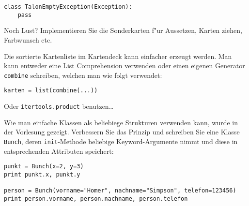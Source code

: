 \begin{aufgabe}
\begin{teilaufgabe}[Grundlagen]
\begin{lstlisting}
class TalonEmptyException(Exception):
    pass
\end{lstlisting}
\end{teilaufgabe}
\begin{teilaufgabe}[Spezialkarten]
Noch Lust? Implementieren Sie die Sonderkarten f"ur  Aussetzen, Karten ziehen, Farbwunsch etc.
\end{teilaufgabe}
\begin{teilaufgabe}[F"ur Profis]
Die sortierte Kartenliste im Kartendeck kann einfacher erzeugt werden. Man kann entweder eine List Comprehension verwenden oder einen eigenen Generator \lstinline{combine} schreiben, welchen man wie folgt verwendet:
\begin{lstlisting}
karten = list(combine(...))
\end{lstlisting}
Oder \lstinline{itertools.product} benutzen\dots
\end{teilaufgabe}
\end{aufgabe}

\begin{aufgabe}[F"ur Profis]
Wie man einfache Klassen als beliebiege Strukturen verwenden kann, wurde in der Vorlesung gezeigt. Verbessern Sie das Prinzip und schreiben Sie eine Klasse \lstinline{Bunch}, deren \lstinline{init}-Methode beliebige Keyword-Argumente nimmt und diese in entsprechenden Attributen speichert:
\begin{lstlisting}
punkt = Bunch(x=2, y=3)
print punkt.x, punkt.y

person = Bunch(vorname="Homer", nachname="Simpson", telefon=123456)
print person.vorname, person.nachname, person.telefon
\end{lstlisting}
\end{aufgabe}


